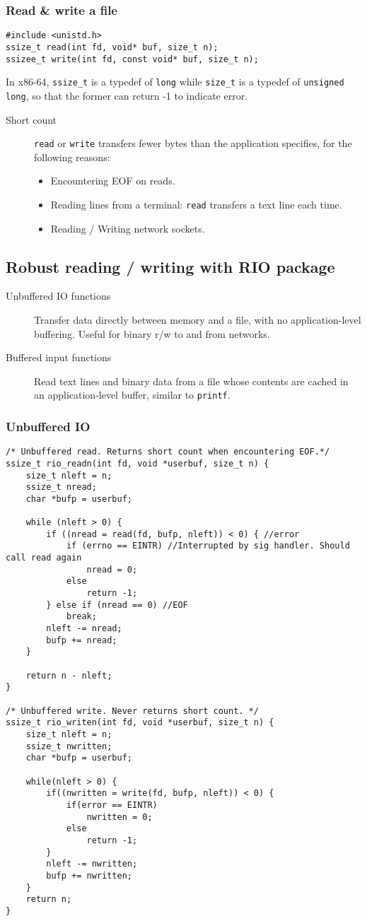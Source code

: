 \subsubsection{Read \& write a file}
\begin{lstlisting}[frame = single]
#include <unistd.h>
ssize_t read(int fd, void* buf, size_t n);
ssizee_t write(int fd, const void* buf, size_t n);
\end{lstlisting}
In x86-64, \texttt{ssize\_t} is a typedef of \texttt{long} while \texttt{size\_t} is a typedef of \texttt{unsigned long}, so that the former can return -1 to indicate error.
\begin{description}
\item[Short count]\texttt{read} or \texttt{write} transfers fewer bytes than the application specifies, for the following reasons:
\begin{itemize}
	\item Encountering EOF on reads.
	\item Reading lines from a terminal: \texttt{read} transfers a text line each time.
	\item Reading / Writing network sockets.
\end{itemize}
\end{description}
\subsection{Robust reading / writing with RIO package}
\begin{description}
\item[Unbuffered IO functions] Transfer data directly between memory and a file, with no application-level buffering. Useful for binary r/w to and from networks.
\item[Buffered input functions] Read text lines and binary data from a file whose contents are cached in an application-level buffer, similar to \texttt{printf}.
\end{description}
\subsubsection{Unbuffered IO}
\begin{lstlisting}[frame=single]
/* Unbuffered read. Returns short count when encountering EOF.*/
ssize_t rio_readn(int fd, void *userbuf, size_t n) {
	size_t nleft = n;
	ssize_t nread;
	char *bufp = userbuf;

	while (nleft > 0) {
		if ((nread = read(fd, bufp, nleft)) < 0) { //error
			if (errno == EINTR) //Interrupted by sig handler. Should call read again
				nread = 0;
			else
				return -1; 
		} else if (nread == 0) //EOF
			break;
		nleft -= nread;
		bufp += nread;
	}

	return n - nleft;
}

/* Unbuffered write. Never returns short count. */
ssize_t rio_writen(int fd, void *userbuf, size_t n) {
	size_t nleft = n;
	ssize_t nwritten;
	char *bufp = userbuf;

	while(nleft > 0) {
		if((nwritten = write(fd, bufp, nleft)) < 0) {
			if(error == EINTR) 
				nwritten = 0;
			else
				return -1;
		}
		nleft -= nwritten;
		bufp += nwritten;
	}
	return n;
}
\end{lstlisting}
